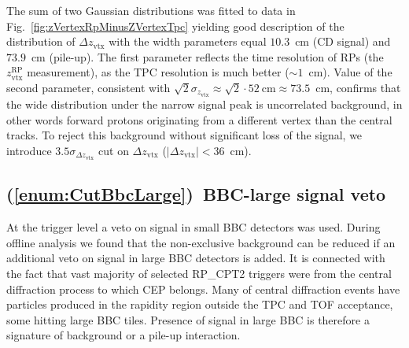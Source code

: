 The sum of two Gaussian distributions was fitted to data in Fig.~\ref{fig:zVertexRpMinusZVertexTpc} yielding good description of the distribution of $\Delta z_{\text{vtx}}$ with the width parameters equal $10.3$~cm (CD signal) and $73.9$~cm (pile-up). The first parameter reflects the time resolution of RPs (the $z_{\text{vtx}}^{\text{RP}}$ measurement), as the TPC resolution is much better ($\sim 1$~cm). Value of the second parameter, consistent with $\sqrt{2}\sigma_{z_{\text{vtx}}}\approx\sqrt{2}\cdot52~\text{cm}\approx 73.5$~cm, confirms that the wide distribution under the narrow signal peak is uncorrelated background, in other words forward protons originating from a different vertex than the central tracks. To reject this background without significant loss of the signal, we introduce $3.5\sigma_{\Delta z_{\text{vtx}}}$ cut on $\Delta z_{\text{vtx}}$ ($|\Delta z_{\text{vtx}}|<36$~cm).






\subsection{(\ref{enum:CutBbcLarge})~BBC-large signal veto}\label{sec:C6}

At the trigger level a veto on signal in small BBC detectors was used. During offline analysis we found that the non-exclusive background can be reduced if an additional veto on signal in large BBC detectors is added. It is connected with the fact that vast majority of selected RP\_CPT2 triggers were from the central diffraction process to which CEP belongs. Many of central diffraction events have particles produced in the rapidity region outside the TPC and TOF acceptance, some hitting large BBC tiles. Presence of signal in large BBC is therefore a signature of background or a pile-up interaction.

